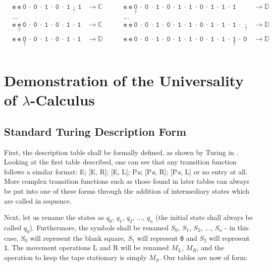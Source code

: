 \documentclass[Master.tex]{subfiles}
\begin{document}
\begin{equation*}
\begin{aligned}
&\mathtt{e\ e\ 0\ \cdot\ 0\ \cdot\ 1\ \cdot\ 0\ \cdot\ 1\ \underset{\uparrow}{\cdot}\ 1} & \rightarrow \mathbb{C}\ \ \ \ \ \ \ \ \ \ & \mathtt{e\ e\ \underset{\uparrow}{0}\ \cdot\ 0\ \cdot\ 1\ \cdot\ 0\ \cdot\ 1\ \cdot\ 1\ \cdot\ 0\ \cdot\ 1\ \cdot\ 1\ \cdot\ 1} & \rightarrow \mathbb{D}\\
&...& &...&\\
&\mathtt{e\ \underset{\uparrow}{e}\ 0\ \cdot\ 0\ \cdot\ 1\ \cdot\ 0\ \cdot\ 1\ \cdot\ 1} & \rightarrow \mathbb{C}\ \ \ \ \ \ \ \ \ \ & \mathtt{e\ e\ 0\ \cdot\ 0\ \cdot\ 1\ \cdot\ 0\ \cdot\ 1\ \cdot\ 1\ \cdot\ 0\ \cdot\ 1\ \cdot\ 1\ \cdot\ 1\ \cdot\ \underset{\uparrow}{\cdot}} & \rightarrow \mathbb{D}\\
&\mathtt{e\ e\ \underset{\uparrow}{0}\ \cdot\ 0\ \cdot\ 1\ \cdot\ 0\ \cdot\ 1\ \cdot\ 1} & \rightarrow \mathbb{D}\ \ \ \ \ \ \ \ \ \ & \mathtt{e\ e\ 0\ \cdot\ 0\ \cdot\ 1\ \cdot\ 0\ \cdot\ 1\ \cdot\ 1\ \cdot\ 0\ \cdot\ 1\ \cdot\ 1\ \cdot\ \underset{\uparrow}{1}\ \cdot\ 0} & \rightarrow \mathbb{D}\\
\end{aligned}
\end{equation*}

\clearpage


\section{Demonstration of the Universality of $\lambda$-Calculus}\label{appendix:lambdauniversaldemo}

\subsection{Standard Turing Description Form}

First, the description table shall be formally defined, as shown by Turing in \cite{turing1936computablenumbers}. Looking at the first table described, one can see that any transition function follows a similar format: E; [E, R]; [E, L]; P\textit{a}; [P\textit{a}, R]; [P\textit{a}, L] or no entry at all. More complex transition functions such as those found in later tables can always be put into one of these forms through the addition of intermediary states which are called in sequence.

Next, let us rename the states as $q_0$, $q_1$, $q_2$, $...$, $q_n$ (the initial state shall always be called $q_0$). Furthermore, the symbols shall be renamed $S_0$, $S_1$, $S_2$, $...$, $S_n$ - in this case, $S_0$ will represent the blank square, $S_1$ will represent \texttt{0} and $S_2$ will represent \texttt{1}. The movement operations L and R will be renamed $M_L$, $M_R$, and the operation to keep the tape stationary is simply $M_S$. Our tables are now of form:
\end{document}
